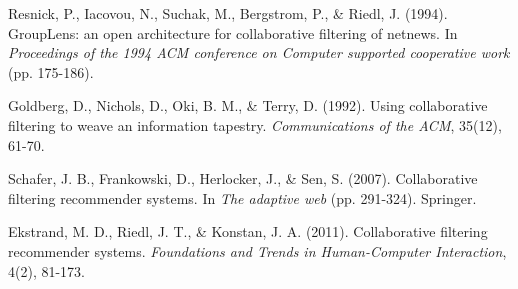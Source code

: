 \documentclass[12pt,a4paper]{article}
\begin{document}
\begin{thebibliography}{15}
Resnick, P., Iacovou, N., Suchak, M., Bergstrom, P., \& Riedl, J. (1994). GroupLens: an open architecture for collaborative filtering of netnews. In \textit{Proceedings of the 1994 ACM conference on Computer supported cooperative work} (pp. 175-186).

Goldberg, D., Nichols, D., Oki, B. M., \& Terry, D. (1992). Using collaborative filtering to weave an information tapestry. \textit{Communications of the ACM}, 35(12), 61-70.

Schafer, J. B., Frankowski, D., Herlocker, J., \& Sen, S. (2007). Collaborative filtering recommender systems. In \textit{The adaptive web} (pp. 291-324). Springer.

Ekstrand, M. D., Riedl, J. T., \& Konstan, J. A. (2011). Collaborative filtering recommender systems. \textit{Foundations and Trends in Human-Computer Interaction}, 4(2), 81-173.

\end{thebibliography}
\end{document}
